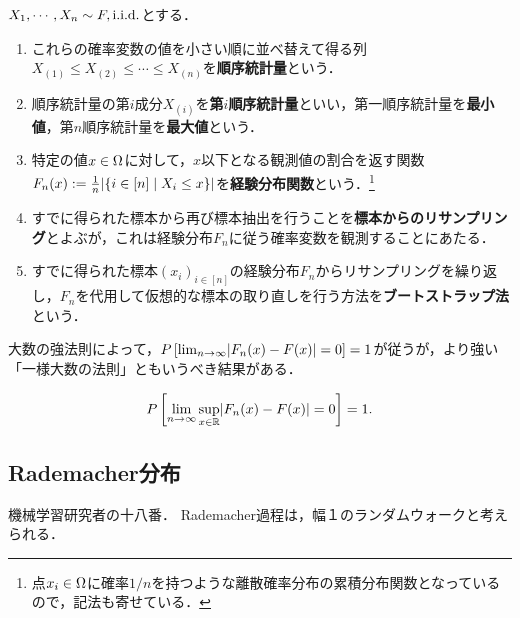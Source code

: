 \documentclass[uplatex,dvipdfmx]{jsreport}
\begin{document}
\begin{definition}
    $X_1,\cdots,X_n\sim F,\mathrm{i.i.d.}$とする．
    \begin{enumerate}
        \item これらの確率変数の値を小さい順に並べ替えて得る列$X_{(1)}\le X_{(2)}\le\cdots\le X_{(n)}$を\textbf{順序統計量}という．
        \item 順序統計量の第$i$成分$X_{(i)}$を\textbf{第$i$順序統計量}といい，第一順序統計量を\textbf{最小値}，第$n$順序統計量を\textbf{最大値}という．
        \item 特定の値$x\in\Omega$に対して，$x$以下となる観測値の割合を返す関数$F_n(x):=\frac{1}{n}\lvert\left\{i\in[n]\mid X_i\le x\right\}\rvert$を\textbf{経験分布関数}という．\footnote{点$x_i\in\Omega$に確率$1/n$を持つような離散確率分布の累積分布関数となっているので，記法も寄せている．}
        \item すでに得られた標本から再び標本抽出を行うことを\textbf{標本からのリサンプリング}とよぶが，これは経験分布$F_n$に従う確率変数を観測することにあたる．
        \item すでに得られた標本$(x_i)_{i\in[n]}$の経験分布$F_n$からリサンプリングを繰り返し，$F_n$を代用して仮想的な標本の取り直しを行う方法を\textbf{ブートストラップ法}という．
    \end{enumerate}
\end{definition}
\begin{remark}
    大数の強法則によって，$P\left[\lim_{n\to\infty}\lvert F_n(x)-F(x)\rvert=0\right]=1$が従うが，より強い「一様大数の法則」ともいうべき結果がある．
\end{remark}

\begin{theorem}
    \[P\left[\lim_{n\to\infty}\sup_{x\in\mathbb{R}}\lvert F_n(x)-F(x)\rvert=0\right]=1.\]
\end{theorem}

\subsection{Rademacher分布}

\begin{tcolorbox}[colframe=ForestGreen, colback=ForestGreen!10!white,breakable,colbacktitle=ForestGreen!40!white,coltitle=black,fonttitle=\bfseries\sffamily,
title=]
    機械学習研究者の十八番．
    Rademacher過程は，幅１のランダムウォークと考えられる．
\end{tcolorbox}
\end{document}
